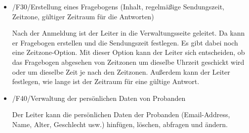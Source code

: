 \documentclass[a4paper]{scrreprt}
\begin{document}
        \begin{itemize}
            \item /F30/Erstellung eines Fragebogens (Inhalt, regelmäßige Sendungszeit, Zeitzone, gültiger Zeitraum für die Antworten)

            	\par Nach der Anmeldung ist der Leiter in die Verwaltungsseite geleitet. Da kann er Fragebogen erstellen und die Sendungszeit festlegen. Es gibt dabei noch eine Zeitzone-Option. Mit dieser Option kann der Leiter sich entscheiden, ob das Fragebogen abgesehen von Zeitzonen um dieselbe Uhrzeit geschickt wird oder um dieselbe Zeit je nach den Zeitzonen. Außerdem kann der Leiter festlegen, wie lange ist der Zeitraum für eine gültige Antwort.
                
        \end{itemize}
        
        \begin{itemize}
            \item /F40/Verwaltung der persönlichen Daten von Probanden

            	\par Der Leiter kann die persönlichen Daten der Probanden (Email-Address, Name, Alter, Geschlecht usw.) hinfügen, löschen, abfragen und ändern.

        \end{itemize}
        
\end{document}
